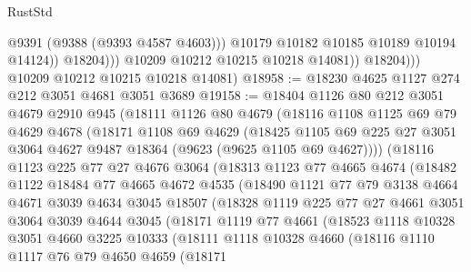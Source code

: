 \begin{lexlean}{RustStd}
\begin{coremodule}
                            @9391
                            (@9388 (@9393 @4587 @4603)))
                          @10179
                          @10182
                          @10185
                          @10189
                          @10194
                          @14124))
                      @18204)))
                @10209
                @10212
                @10215
                @10218
                @14081))
            @18204)))
      @10209
      @10212
      @10215
      @10218
      @14081)
@18958 := @18230 @4625 @1127 @274 @212 @3051 @4681 @3051 @3689
@19158 := @18404
    @1126
    @80
    @212
    @3051
    @4679
    @2910
    @945
    (@18111
      @1126
      @80
      @4679
      (@18116
        @1108
        @1125
        @69
        @79
        @4629
        @4678
        (@18171
          @1108
          @69
          @4629
          (@18425
            @1105
            @69
            @225
            @27
            @3051
            @3064
            @4627
            @9487
            @18364
            (@9623 (@9625 @1105 @69 @4627))))
        (@18116
          @1123
          @225
          @77
          @27
          @4676
          @3064
          (@18313
            @1123
            @77
            @4665
            @4674
            (@18482
              @1122
              @18484
              @77
              @4665
              @4672
              @4535
              (@18490
                @1121
                @77
                @79
                @3138
                @4664
                @4671
                @3039
                @4634
                @3045
                @18507
                (@18328
                  @1119
                  @225
                  @77
                  @27
                  @4661
                  @3051
                  @3064
                  @3039
                  @4644
                  @3045
                  (@18171
                    @1119
                    @77
                    @4661
                    (@18523
                      @1118
                      @10328
                      @3051
                      @4660
                      @3225
                      @10333
                      (@18111
                        @1118
                        @10328
                        @4660
                        (@18116
                          @1110
                          @1117
                          @76
                          @79
                          @4650
                          @4659
                          (@18171

\end{coremodule}
\end{lexlean}
